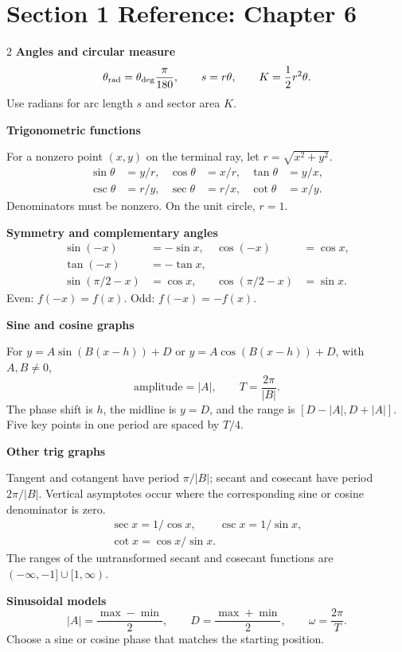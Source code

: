 \documentclass[11pt]{article}
\begin{document}
\section*{Section 1 Reference: Chapter 6}
\begin{multicols}{2}
\small
\textbf{Angles and circular measure}
\[
  \theta_{\rm rad}=\theta_{\rm deg}\frac{\pi}{180},\qquad
  s=r\theta,\qquad K=\frac12r^2\theta.
\]
Use radians for arc length $s$ and sector area $K$.

\medskip
\textbf{Trigonometric functions}

For a nonzero point $(x,y)$ on the terminal ray, let $r=\sqrt{x^2+y^2}$.
\[
\begin{aligned}
  \sin\theta&=y/r,&\cos\theta&=x/r,&\tan\theta&=y/x,\\
  \csc\theta&=r/y,&\sec\theta&=r/x,&\cot\theta&=x/y.
\end{aligned}
\]
Denominators must be nonzero. On the unit circle, $r=1$.

\medskip
\textbf{Symmetry and complementary angles}
\[
\begin{aligned}
  \sin(-x)&=-\sin x,&\cos(-x)&=\cos x,\\
  \tan(-x)&=-\tan x,\\
  \sin(\pi/2-x)&=\cos x,&\cos(\pi/2-x)&=\sin x.
\end{aligned}
\]
Even: $f(-x)=f(x)$. Odd: $f(-x)=-f(x)$.

\columnbreak
\textbf{Sine and cosine graphs}

For $y=A\sin(B(x-h))+D$ or $y=A\cos(B(x-h))+D$, with $A,B\ne0$,
\[
  \text{amplitude}=|A|,\qquad T=\frac{2\pi}{|B|}.
\]
The phase shift is $h$, the midline is $y=D$, and the range is
$[D-|A|,D+|A|]$. Five key points in one period are spaced by $T/4$.

\medskip
\textbf{Other trig graphs}

Tangent and cotangent have period $\pi/|B|$; secant and cosecant have period
$2\pi/|B|$. Vertical asymptotes occur where the corresponding sine or cosine
denominator is zero.
\[
\begin{gathered}
  \sec x=1/\cos x,\qquad\csc x=1/\sin x,\\
  \cot x=\cos x/\sin x.
\end{gathered}
\]
The ranges of the untransformed secant and cosecant functions are
$(-\infty,-1]\cup[1,\infty)$.

\medskip
\textbf{Sinusoidal models}
\[
  |A|=\frac{\max-\min}{2},\qquad D=\frac{\max+\min}{2},\qquad
  \omega=\frac{2\pi}{T}.
\]
Choose a sine or cosine phase that matches the starting position.
\end{multicols}
\end{document}
